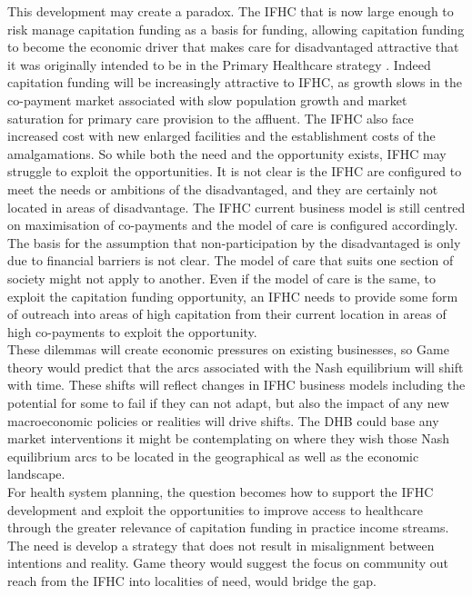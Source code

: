 \documentclass[11pt,a4paper]{article}
\begin{document}
This development may create a paradox. The IFHC that is now large enough to risk manage capitation funding as a basis for funding, allowing capitation funding to become the economic driver that makes care for disadvantaged attractive that it was originally intended to be in the Primary Healthcare strategy \citep{king2001primary}. Indeed capitation funding will be increasingly attractive to IFHC, as growth slows in the co-payment market associated with slow population growth and market saturation for primary care provision to the affluent. The IFHC also face increased cost with new enlarged facilities and the establishment costs of the amalgamations. So while both the need and the opportunity exists, IFHC may struggle to exploit the opportunities. It is not clear is the IFHC are configured to meet the needs or ambitions of the disadvantaged, and they are certainly not located in areas of disadvantage. The IFHC current business model is still centred on maximisation of co-payments and the model of care is configured accordingly. The basis for the assumption that non-participation by the disadvantaged is only due to financial barriers is not clear. The model of care that suits one section of society might not apply to another. Even if the model of care is the same, to exploit the capitation funding opportunity, an IFHC needs to provide some form of outreach into areas of high capitation from their current location in areas of high co-payments to exploit the opportunity.\\

These dilemmas will create economic pressures on existing businesses, so Game theory would predict that the arcs associated with the Nash equilibrium will shift with time. These shifts will reflect changes in IFHC business models including the potential for some to fail if they can not adapt, but also the impact of any new macroeconomic policies or realities will drive shifts. The DHB could base any market interventions it might be contemplating on where they wish those Nash equilibrium arcs to be located in the geographical as well as the economic landscape.\\

For health system planning, the question becomes how to support the IFHC development and exploit the opportunities to improve access to healthcare through the greater relevance of capitation funding in practice income streams. The need is develop a strategy that does not result in misalignment between intentions and reality\citep{kerr1995folly}. Game theory would suggest the focus on community out reach from the IFHC into localities of need, would bridge the gap.\\
\end{document}
